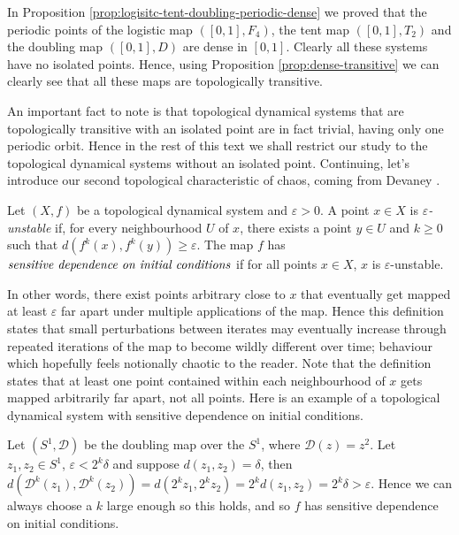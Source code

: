 \begin{exmp} \label{exmp:logistic-tent-doubling-transitive}
    In Proposition \ref{prop:logisitc-tent-doubling-periodic-dense} we proved that the periodic points of the logistic map $([0, 1], F_4)$, the tent map $([0, 1], T_2)$ and the doubling map $([0, 1], D)$ are dense in $[0, 1]$. Clearly all these systems have no isolated points. Hence, using Proposition \ref{prop:dense-transitive} we can clearly see that all these maps are topologically transitive.
\end{exmp}

An important fact to note is that topological dynamical systems that are topologically transitive with an isolated point are in fact trivial, having only one periodic orbit. Hence in the rest of this text we shall restrict our study to the topological dynamical systems without an isolated point. Continuing, let's introduce our second topological characteristic of chaos, coming from Devaney \cite{devaney}.

\begin{defn} \label{defn:sensitive-dependence}
    Let $(X, f)$ be a topological dynamical system and $\varepsilon > 0$. A point $x \in X$ is \emph{$\varepsilon$-unstable} if, for every neighbourhood $U$ of $x$, there exists a point $y \in U$ and $k \geq 0$ such that $d\left(f^k(x), f^k(y)\right) \geq \varepsilon$. The map $f$ has $\emph{sensitive dependence on initial conditions}$ if for all points $x \in X$, $x$ is $\varepsilon$-unstable.
\end{defn}

In other words, there exist points arbitrary close to $x$ that eventually get mapped at least $\varepsilon$ far apart under multiple applications of the map. Hence this definition states that small perturbations between iterates may eventually increase through repeated iterations of the map to become wildly different over time; behaviour which hopefully feels notionally chaotic to the reader. Note that the definition states that at least one point contained within each neighbourhood of $x$ gets mapped arbitrarily far apart, not all points. Here is an example of a topological dynamical system with sensitive dependence on initial conditions.

\begin{exmp} \label{exmp:doubling-map-s1-sensitive}
    Let $(S^1, \mathcal{D})$ be the doubling map over the $S^1$, where $\mathcal{D}(z) = z^2$. Let $z_1, z_2 \in S^1$, $\varepsilon < 2^k \delta$ and suppose $d(z_1, z_2) = \delta$, then $d\left(\mathcal{D}^k(z_1), \mathcal{D}^k(z_2)\right) =  d\left(2^kz_1, 2^kz_2\right) = 2^k d(z_1, z_2) = 2^k \delta > \varepsilon$. Hence we can always choose a $k$ large enough so this holds, and so $f$ has sensitive dependence on initial conditions.
\end{exmp}

